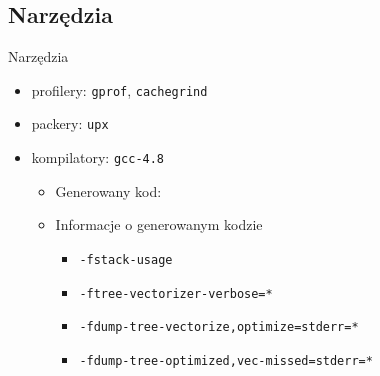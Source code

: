 \subsection{Narzędzia}
\begin{frame}[fragile]{Narzędzia}
	\begin{itemize}
		\item profilery: \texttt{gprof}, \texttt{cachegrind}
		\item packery: \texttt{upx}
		\item kompilatory: \texttt{gcc-4.8}
		\begin{itemize}
			\item Generowany kod:
			\item Informacje o generowanym kodzie
			\begin{itemize}
				\item \texttt{-fstack-usage}
				\item \texttt{-ftree-vectorizer-verbose=*}
				\item \texttt{-fdump-tree-{vectorize,optimize}=stderr=*}
				\item \texttt{-fdump-tree-{optimized,vec-missed}=stderr=*}
			\end{itemize}
		\end{itemize}
	\end{itemize}
\end{frame}
